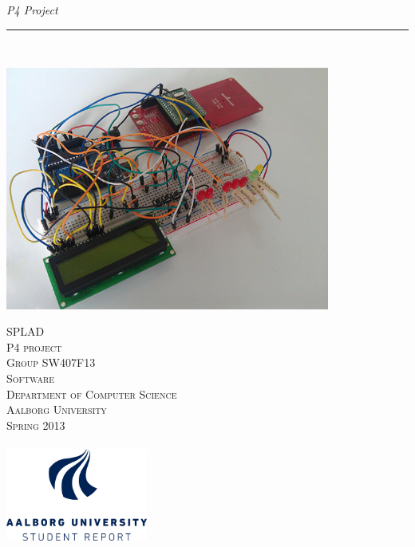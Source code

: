 \thispagestyle{empty}
\begin{flushright}
\vspace{3cm}

\phantom{hul}

\phantom{hul}

\phantom{hul}

\textsl{P4 Project} \\ \vspace{1cm}

\rule{0.8\textwidth}{3mm} \\ \vspace{1.5cm}

\includegraphics[width=0.8\textwidth]{billeder/HardwareSetup.png}

\vspace{1.5cm} 
\textsc{\Large SPLAD \\
P4 project\\
Group SW407F13\\
Software\\
Department of Computer Science\\
Aalborg University\\
Spring 2013\\
~\\
}
\includegraphics[width=0.35\textwidth]{billeder/AAUUKSTUDENTREPORTbluergb.png}
\end{flushright}
